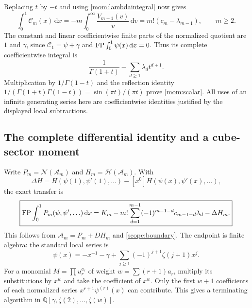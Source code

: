 \documentclass[11pt,letterpaper]{article}
\numberwithin{equation}{section}
\theoremstyle{plain}
\theoremstyle{definition}
\theoremstyle{remark}
\newcommand{\Q}{\mathbb Q}\newcommand{\R}{\mathbb R}\newcommand{\C}{\mathbb C}
\newcommand{\dd}{\,\mathrm d}\newcommand{\iu}{\mathrm i}
\newcommand{\NN}{\mathcal N}\newcommand{\HH}{\mathcal H}
\newcommand{\Acal}{\mathcal A}\newcommand{\cA}{\mathcal A}
\begin{document}
Replacing $t$ by $-t$ and using \eqref{mom:lambdaintegral} now gives
\[
 \int_0^1\mathcal C_m(x)\dd x
 =-m\int_0^\infty\frac{V_{m-1}(v)}v\dd v
 =m!(c_m-\lambda_{m-1}),\qquad m\ge2.
\]
The constant and linear coefficientwise finite parts of the normalized
quotient are $1$ and $\gamma$, since
$\mathcal C_1=\psi+\gamma$ and $\FP\int_0^1\psi(x)\dd x=0$.
Thus its complete coefficientwise integral is
\[
 \frac1{\Gamma(1+t)}-\sum_{d\ge1}\lambda_dt^{d+1}.
\]
Multiplication by $1/\Gamma(1-t)$ and the reflection identity
$1/(\Gamma(1+t)\Gamma(1-t))=\sin(\pi t)/(\pi t)$ prove
\eqref{mom:scalar}. All uses of an infinite generating series here
are coefficientwise identities justified by the displayed local
subtractions.

\subsection{The complete differential identity and a cube-sector moment}

Write $P_m=\NN(\Acal_m)$ and $H_m=\HH(\Acal_m)$. With
\begin{equation}\label{mom:Delta}
 \Delta H=H(\psi(1),\psi'(1),\ldots)
        -[x^0]H(\psi(x),\psi'(x),\ldots),
\end{equation}
the exact transfer is
\begin{equation}\label{mom:transfer}
 \boxed{\displaystyle
 \FP\int_0^1P_m(\psi,\psi',\ldots)\dd x
 =K_m-m!\sum_{d=1}^{m-1}(-1)^{m-1-d}c_{m-1-d}\lambda_d
       -\Delta H_m.}
\end{equation}
This follows from $\Acal_m=P_m+DH_m$ and
\eqref{scope:boundary}. The endpoint is finite algebra: the standard
local series \cite[Section 5.7]{DLMF} is
\[
 \psi(x)=-x^{-1}-\gamma+
             \sum_{j\ge1}(-1)^{j+1}\zeta(j+1)x^j.
\]
For a monomial $M=\prod u_r^{a_r}$ of weight
$w=\sum(r+1)a_r$, multiply its substitutions by $x^w$ and take
the coefficient of $x^w$. Only the first $w+1$ coefficients of each
normalized series $x^{r+1}\psi^{(r)}(x)$ can contribute. This gives
a terminating algorithm in $\Q[\gamma,\zeta(2),\ldots,\zeta(w)]$.
\end{document}
